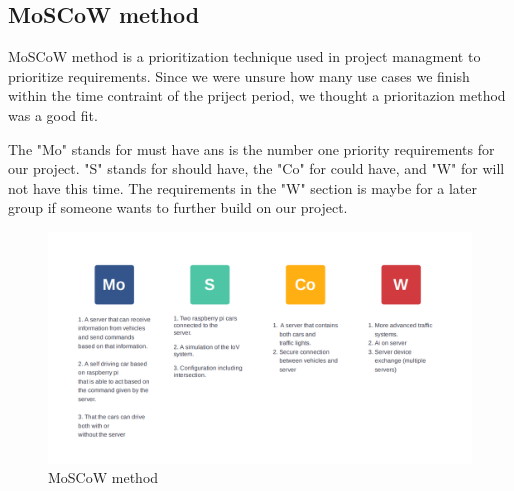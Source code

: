 \subsection{MoSCoW method}


MoSCoW method is a prioritization technique used in project managment to prioritize requirements. Since we were unsure how many use cases we finish within the time contraint of the priject period, we thought a prioritazion method was a good fit.

The "Mo" stands for must have ans is the number one priority requirements for our project. "S" stands for should have, the "Co" for could have, and "W" for will not have this time. The requirements in the "W" section is maybe for a later group if someone wants to further build on our project.

\begin{figure}[h!]
	\centering
	\includegraphics[width=1\linewidth]{figures/MosCoW_method}
	\caption[MosCoW method]{MoSCoW method}
	\label{fig:moscowmethod}
\end{figure}